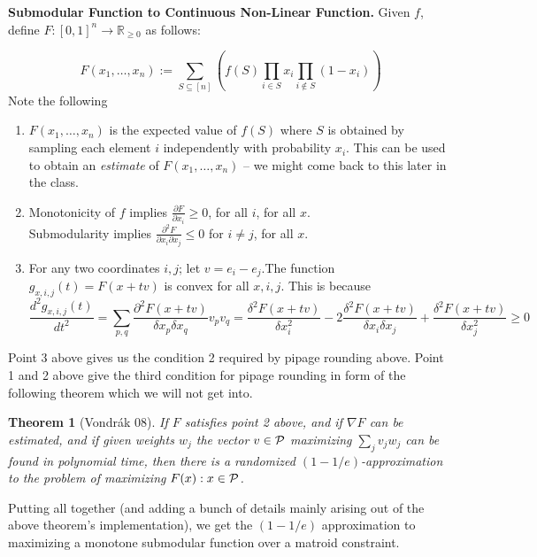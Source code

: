 \documentclass[11pt]{article}
\newtheorem{theorem}{Theorem}
\begin{document}
\noindent
{\bf Submodular Function to Continuous Non-Linear Function.} Given $f$, define $F:[0,1]^n \to {\mathbb R}_{\ge 0}$ as follows:

$$ F(x_1,\ldots,x_n) := \sum_{S\subseteq [n]} \left( f(S)\prod_{i\in S} x_i \prod_{i\notin S} (1-x_i) \right)$$
\noindent
Note the following
\begin{enumerate}
\item $F(x_1,\ldots,x_n)$ is the expected value of $f(S)$ where $S$ is obtained by sampling each element $i$ independently with probability $x_i$. This can be used to obtain an {\em estimate} of $F(x_1,\ldots,x_n)$ -- we might come back to this later in the class.


\item Monotonicity of $f$ implies $\frac{\partial F}{\partial x_i} \ge 0$, for all $i$, for all $x$.\\
	Submodularity implies $\frac{\partial^2 F}{\partial x_i \partial x_j} \le 0$ for $i\neq j$, for all $x$.

\item For any two coordinates $i,j$; let $v = e_i - e_j$.The function $g_{x,i,j}(t) = F(x+ tv)$ is convex for all $x,i,j$. This is because 
$$\frac{d^2 g_{x,i,j}(t)}{dt^2} = \sum_{p,q} \frac{\partial^2 F(x+tv)}{\delta x_p \delta x_q} v_pv_q = \frac{\delta^2 F(x+tv)}{\delta x_i^2} - 2\frac{\delta^2 F(x+tv)}{\delta x_i \delta x_j} + \frac{\delta^2 F(x+tv)}{\delta x_j^2} \ge 0$$

\end{enumerate}
\noindent
Point 3 above gives us the condition 2 required by pipage rounding above. Point 1 and 2 above give the third condition for pipage rounding in form of the following theorem which we will not get into.

\begin{theorem}[Vondr\'ak 08]
If $F$ satisfies point 2 above, and if $\nabla{F}$ can be estimated, and if given weights $w_j$ the vector $v\in \P$ maximizing $\sum_j v_jw_j$ can be found in polynomial time, then there is a randomized $(1-1/e)$-approximation to the problem of maximizing $F(x): x\in \P$.
\end{theorem}

Putting all together (and adding a bunch of details mainly arising out of the above theorem's implementation),
we get the $(1-1/e)$ approximation to maximizing a monotone submodular function over a matroid constraint.
\end{document}
